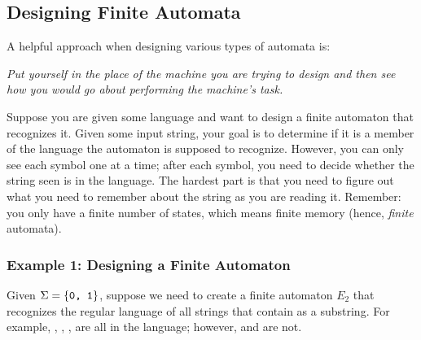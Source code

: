 \documentclass[letterpaper]{article}
\begin{document}
\subsection{Designing Finite Automata}
A helpful approach when designing various types of automata is: 
\begin{mdframed}[]
    \emph{Put yourself in the place of the machine you are trying to design and then see how you would go about performing the machine's task.}
\end{mdframed} 
Suppose you are given some language and want to design a finite automaton that recognizes it. Given some input string, your goal is to determine if it is a member of the language the automaton is supposed to recognize. However, you can only see each symbol one at a time; after each symbol, you need to decide whether the string seen is in the language. The hardest part is that you need to figure out what you need to remember about the string as you are reading it. Remember: you only have a finite number of states, which means finite memory (hence, \emph{finite} automata). 

\subsubsection{Example 1: Designing a Finite Automaton}
Given $\Sigma = \{\texttt{0, 1}\}$, suppose we need to create a finite automaton $E_2$ that recognizes the regular language of all strings that contain  as a substring. For example, , , ,  are all in the language; however,  and  are not.

\bigskip
\end{document}

